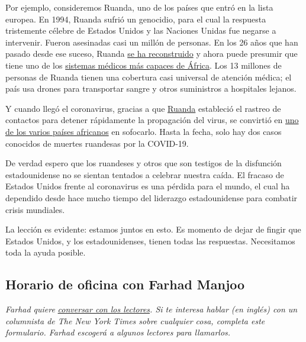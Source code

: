 Por ejemplo, consideremos Ruanda, uno de los países que entró en la
lista europea. En 1994, Ruanda sufrió un genocidio, para el cual la
respuesta tristemente célebre de Estados Unidos y las Naciones Unidas
fue negarse a intervenir. Fueron asesinadas casi un millón de personas.
En los 26 años que han pasado desde ese suceso, Ruanda
\href{https://www.nytimes3xbfgragh.onion/2019/04/06/world/africa/rwanda-genocide-25-years.html}{se
ha reconstruido} y ahora puede presumir que tiene uno de los
\href{https://www.atlanticcouncil.org/blogs/africasource/rwandas-successes-and-challenges-in-response-to-covid-19/}{sistemas
médicos más capaces de África}. Los 13 millones de personas de Ruanda
tienen una cobertura casi universal de atención médica; el país usa
drones para transportar sangre y otros suministros a hospitales lejanos.

Y cuando llegó el coronavirus, gracias a que
\href{https://www.newyorker.com/news/news-desk/what-african-nations-are-teaching-the-west-about-fighting-the-coronavirus}{Ruanda}
estableció el rastreo de contactos para detener rápidamente la
propagación del virus, se convirtió en
\href{https://www.newyorker.com/news/news-desk/what-african-nations-are-teaching-the-west-about-fighting-the-coronavirus}{uno
de los varios países africanos} en sofocarlo. Hasta la fecha, solo hay
dos casos conocidos de muertes ruandesas por la COVID-19.

De verdad espero que los ruandeses y otros que son testigos de la
disfunción estadounidense no se sientan tentados a celebrar nuestra
caída. El fracaso de Estados Unidos frente al coronavirus es una pérdida
para el mundo, el cual ha dependido desde hace mucho tiempo del
liderazgo estadounidense para combatir crisis mundiales.

La lección es evidente: estamos juntos en esto. Es momento de dejar de
fingir que Estados Unidos, y los estadounidenses, tienen todas las
respuestas. Necesitamos toda la ayuda posible.

\hypertarget{horario-de-oficina-con-farhad-manjoo}{%
\subsection{Horario de oficina con Farhad
Manjoo}\label{horario-de-oficina-con-farhad-manjoo}}

\emph{Farhad quiere}
\href{https://www.nytimes3xbfgragh.onion/2019/05/16/opinion/farhad-office-hours.html?module=inline}{\emph{conversar
con los lectores}}\emph{. Si te interesa hablar (en inglés) con un
columnista de The New York Times sobre cualquier cosa, completa este
formulario. Farhad escogerá a algunos lectores para llamarlos.}

